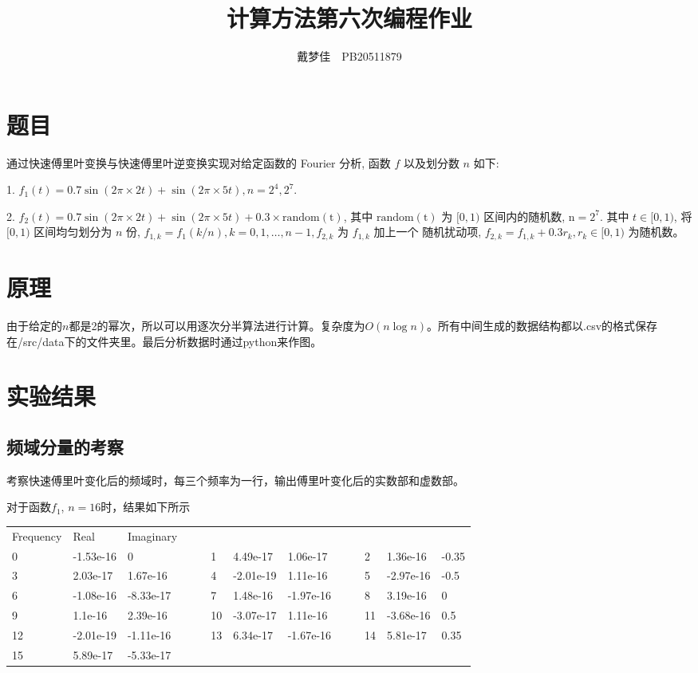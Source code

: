 \documentclass[english]{ctexart}
\providecommand{\tabularnewline}{\\}
\begin{document}
\title{计算方法第六次编程作业}
\author{戴梦佳\ \ PB20511879}
\maketitle

\section{题目}

通过快速傅里叶变换与快速傅里叶逆变换实现对给定函数的 Fourier 分析, 函数 $f$ 以及划分数 $n$ 如下: 

1. $f_{1}(t)=0.7\sin(2\pi\times2t)+\sin(2\pi\times5t),n=2^{4},2^{7}$.

2. $f_{2}(t)=0.7\sin(2\pi\times2t)+\sin(2\pi\times5t)+0.3\times\mathrm{random(t)}$,
其中 $\mathrm{random}(\mathrm{t})$ 为 $[0,1)$ 区间内的随机数, $\mathrm{n}=2^{7}$.
其中 $t\in[0,1)$, 将 $[0,1)$ 区间均匀划分为 $n$ 份, $f_{1,k}=f_{1}(k/n),k=0,1,\ldots,n-1,f_{2,k}$
为 $f_{1,k}$ 加上一个 随机扰动项, $f_{2,k}=f_{1,k}+0.3r_{k},r_{k}\in[0,1)$
为随机数。

\section{原理}

由于给定的$n$都是2的幂次，所以可以用逐次分半算法进行计算。复杂度为$O(n\log n)$。所有中间生成的数据结构都以.csv的格式保存在/src/data下的文件夹里。最后分析数据时通过python来作图。

\section{实验结果}

\subsection{频域分量的考察}

考察快速傅里叶变化后的频域时，每三个频率为一行，输出傅里叶变化后的实数部和虚数部。

对于函数$f_{1}$, $n=16$时，结果如下所示

\begin{tabular}{lllllllllllll}
Frequency & Real & Imaginary &  &  &  &  &  &  &  &  &  & \tabularnewline
0 & -1.53e-16 & 0 &  &  & 1 & 4.49e-17 & 1.06e-17 &  &  & 2 & 1.36e-16 & -0.35\tabularnewline
3 & 2.03e-17 & 1.67e-16 &  &  & 4 & -2.01e-19 & 1.11e-16 &  &  & 5 & -2.97e-16 & -0.5\tabularnewline
6 & -1.08e-16 & -8.33e-17 &  &  & 7 & 1.48e-16 & -1.97e-16 &  &  & 8 & 3.19e-16 & 0\tabularnewline
9 & 1.1e-16 & 2.39e-16 &  &  & 10 & -3.07e-17 & 1.11e-16 &  &  & 11 & -3.68e-16 & 0.5\tabularnewline
12 & -2.01e-19 & -1.11e-16 &  &  & 13 & 6.34e-17 & -1.67e-16 &  &  & 14 & 5.81e-17 & 0.35\tabularnewline
15 & 5.89e-17 & -5.33e-17 &  &  &  &  &  &  &  &  &  & \tabularnewline
\end{tabular}
\end{document}
